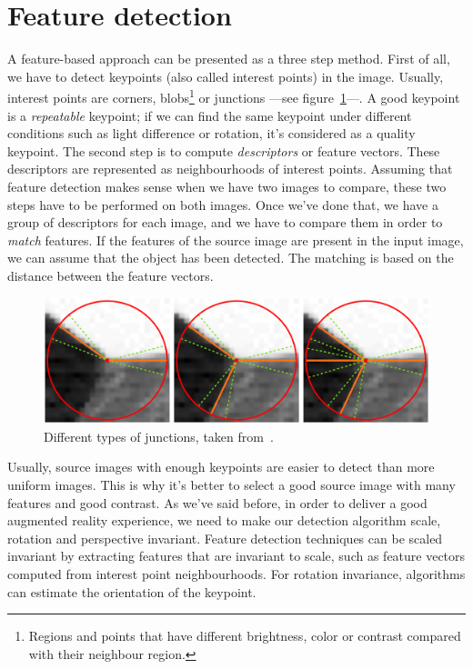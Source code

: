 \section{Feature detection}
A feature-based approach can be presented as a three step method. First of all, we
have to detect keypoints\cite{feature} (also called interest points) in the image. Usually,
interest points are corners, blobs\footnote{Regions and points that have
  different brightness, color or contrast compared with their neighbour
  region.} or junctions ---see figure~\ref{fig:junctions}---. A good keypoint is a 
\emph{repeatable} keypoint; if we can find the same keypoint under different
conditions such as light difference or rotation, it's considered as a quality
keypoint. The second step is to compute \emph{descriptors} or feature
vectors. These descriptors are represented as neighbourhoods of interest
points. Assuming that feature
detection makes sense when we have two images to compare, these two steps have to be
performed on both images. Once we've done that, we have a group of descriptors for
each image, and we have to compare them in order to \emph{match} features. If the
features of the source image are present in the input image, we can assume that the
object has been detected. The matching is based on the distance between the feature
vectors. 

\begin{figure}
\centering
\includegraphics[scale=0.25]{img/junction.png}
\caption{\label{fig:junctions}Different types of junctions, taken
  from~\cite{junction}.} 
\end{figure} 

Usually, source images with enough keypoints are easier to detect than more
uniform images. This is why it's better to select a good source image with many
features and good contrast. 
As we've said before, in order to deliver a good augmented reality experience,
we need to make our detection algorithm scale, rotation and perspective
invariant. Feature detection techniques can be scaled invariant by extracting
features that are invariant to scale, such as feature vectors computed from
interest point neighbourhoods. For rotation invariance, algorithms can
estimate the orientation of the keypoint. %

